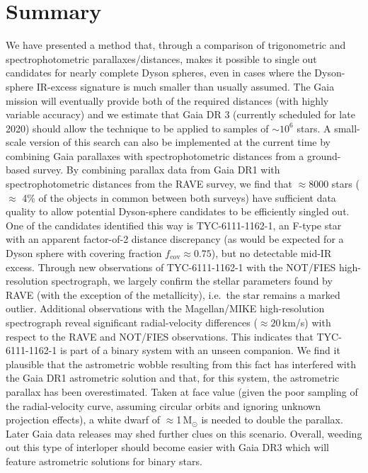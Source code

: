 \documentclass[twocolumn]{aastex6}
\begin{document}
\section{Summary}
\label{summary}
We have presented a method that, through a comparison of trigonometric and spectrophotometric parallaxes/distances, makes it possible to single out candidates for nearly complete Dyson spheres, even in cases where the Dyson-sphere IR-excess signature is much smaller than usually assumed. The Gaia mission will eventually provide both of the required distances (with highly variable accuracy) and we estimate that Gaia DR 3 (currently scheduled for late 2020) should allow the technique to be applied to samples of $\sim$$10^6$ stars. A small-scale version of this search can also be implemented at the current time by combining Gaia parallaxes with spectrophotometric distances from a ground-based survey. By combining parallax data from Gaia DR1 with spectrophotometric distances from the RAVE survey, we find that $\approx 8000$ stars ($\approx$ 4\% of the objects in common between both surveys) have sufficient data quality to allow potential Dyson-sphere candidates to be efficiently singled out. One of the candidates identified this way is TYC-6111-1162-1, an F-type star with an apparent factor-of-2 distance discrepancy (as would be expected for a Dyson sphere with covering fraction $f_\mathrm{cov}\approx 0.75$), but no detectable mid-IR excess. Through new observations of TYC-6111-1162-1 with the NOT/FIES high-resolution spectrograph, we largely confirm the stellar parameters found by RAVE (with the exception of the metallicity), i.e.\ the star remains a marked outlier. Additional observations with the Magellan/MIKE high-resolution spectrograph reveal significant radial-velocity differences ($\approx 20$\,km/s) with respect to the RAVE and NOT/FIES observations. This indicates that TYC-6111-1162-1 is part of a binary system with an unseen companion. We find it plausible that the astrometric wobble resulting from this fact has interfered with the Gaia DR1 astrometric solution and that, for this system, the astrometric parallax has been overestimated. Taken at face value (given the poor sampling of the radial-velocity curve, assuming circular orbits and ignoring unknown projection effects), a white dwarf of $\approx$1\,M$_\odot$ is needed to double the parallax. Later Gaia data releases may shed further clues on this scenario. Overall, weeding out this type of interloper should become easier with Gaia DR3 which will feature astrometric solutions for binary stars.   
\end{document}

